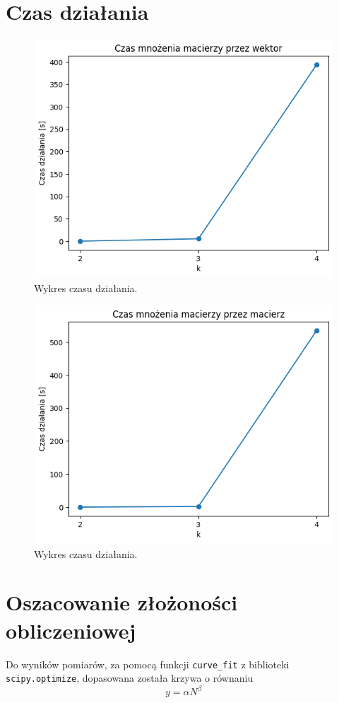 \documentclass[11pt, leqno]{scrartcl}
\begin{document}
    \section{Czas działania}
    \begin{figure}[H]
        \centering
        \includegraphics[width=0.7\linewidth]{matrix_vector_time.png}
        \caption{Wykres czasu działania.}
    \end{figure}
    \begin{figure}[H]
        \centering
        \includegraphics[width=0.7\linewidth]{matrix_matrix_time.png}
        \caption{Wykres czasu działania.}
    \end{figure}

    \section{Oszacowanie złożoności obliczeniowej}
    Do wyników pomiarów, za pomocą funkcji \texttt{curve\_fit}
    z biblioteki \texttt{scipy.optimize}, dopasowana została krzywa
    o równaniu
    \[
        y=\alpha N^\beta
    \]
\end{document}
